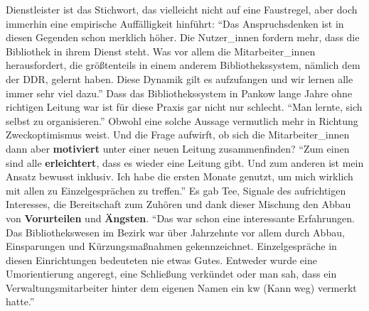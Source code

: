 \documentclass[a4paper,
fontsize=11pt,
oneside,
numbers=noperiodatend,
parskip=half-,
bibliography=totoc,
final
]{scrartcl}
\begin{document}
Dienstleister ist das Stichwort, das vielleicht nicht auf eine
Faustregel, aber doch immerhin eine empirische Auffälligkeit hinführt:
\enquote{Das Anspruchsdenken ist in diesen Gegenden schon merklich
höher. Die Nutzer\_innen fordern mehr, dass die Bibliothek in ihrem
Dienst steht. Was vor allem die Mitarbeiter\_innen herausfordert, die
größtenteils in einem anderem Bibliothekssystem, nämlich dem der DDR,
gelernt haben. Diese Dynamik gilt es aufzufangen und wir lernen alle
immer sehr viel dazu.} Dass das Bibliothekssystem in Pankow lange Jahre
ohne richtigen Leitung war ist für diese Praxis gar nicht nur schlecht.
\enquote{Man lernte, sich selbst zu organisieren.} Obwohl eine solche
Aussage vermutlich mehr in Richtung Zweckoptimismus weist. Und die Frage
aufwirft, ob sich die Mitarbeiter\_innen dann aber \textbf{motiviert}
unter einer neuen Leitung zusammenfinden? \enquote{Zum einen sind alle
\textbf{erleichtert}, dass es wieder eine Leitung gibt. Und zum anderen
ist mein Ansatz bewusst inklusiv. Ich habe die ersten Monate genutzt, um
mich wirklich mit allen zu Einzelgesprächen zu treffen.} Es gab Tee,
Signale des aufrichtigen Interesses, die Bereitschaft zum Zuhören und
dank dieser Mischung den Abbau von \textbf{Vorurteilen} und
\textbf{Ängsten}. \enquote{Das war schon eine interessante Erfahrungen.
Das Bibliothekswesen im Bezirk war über Jahrzehnte vor allem durch
Abbau, Einsparungen und Kürzungsmaßnahmen gekennzeichnet.
Einzelgespräche in diesen Einrichtungen bedeuteten nie etwas Gutes.
Entweder wurde eine Umorientierung angeregt, eine Schließung verkündet
oder man sah, dass ein Verwaltungsmitarbeiter hinter dem eigenen Namen
ein kw (Kann weg) vermerkt hatte.}
\end{document}
